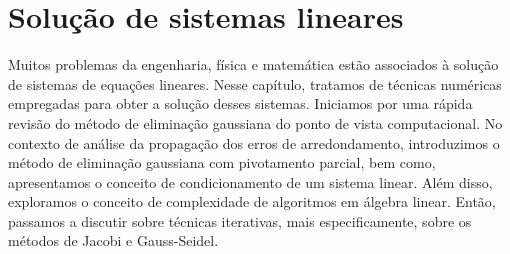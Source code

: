 
\chapter{Solução de sistemas lineares}

Muitos problemas da engenharia, física e matemática estão associados à solução de sistemas de equações lineares. Nesse capítulo, tratamos de técnicas numéricas empregadas para obter a solução desses sistemas. Iniciamos por uma rápida revisão do método de eliminação gaussiana do ponto de vista computacional. No contexto de análise da propagação dos erros de arredondamento, introduzimos o método de eliminação gaussiana com pivotamento parcial, bem como, apresentamos o conceito de condicionamento de um sistema linear. Além disso, exploramos o conceito de complexidade de algoritmos em álgebra linear. Então, passamos a discutir sobre técnicas iterativas, mais especificamente, sobre os métodos de Jacobi e Gauss-Seidel.


